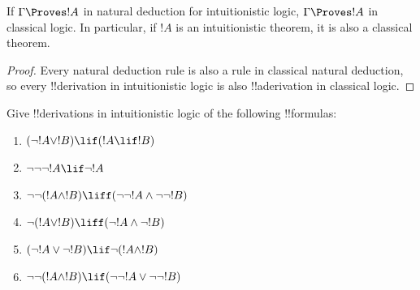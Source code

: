 \documentclass[../../../include/open-logic-section]{subfiles}
\begin{document}
\begin{prop}
  If $\Gamma \Proves !A$ in natural deduction for intuitionistic
  logic, $\Gamma \Proves !A$ in classical logic. In particular, if
  $!A$ is an intuitionistic theorem, it is also a classical theorem.
\end{prop}

\begin{proof}
  Every natural deduction rule is also a rule in classical natural
  deduction, so every !!{derivation} in intuitionistic logic is also
  !!a{derivation} in classical logic.
\end{proof}

\begin{prob}
  Give !!{derivation}s in intuitionistic logic of the following !!{formula}s:
  \begin{enumerate}
    \item $(\lnot !A \lor !B) \lif (!A \lif !B)$
    \item $\lnot\lnot\lnot !A \lif \lnot !A$
    \item $\lnot\lnot (!A \land !B) \liff (\lnot\lnot !A\land \lnot \lnot !B)$
    \item $\lnot (!A \lor !B) \liff (\lnot !A \land \lnot !B)$
    \item $(\lnot !A \lor \lnot !B) \lif \lnot (!A \land !B)$
    \item $\lnot\lnot ( !A \land !B) \lif  (\lnot\lnot !A \lor
    \lnot\lnot !B)$
  \end{enumerate}
\end{prob}
\end{document}
